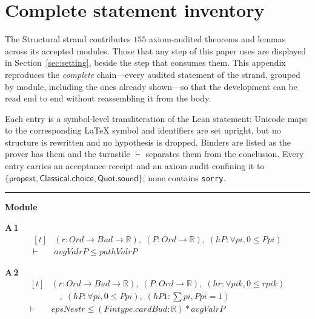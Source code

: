 \appendices
\section{Complete statement inventory}
\label{app:inventory}

The Structural strand contributes $155$ axiom-audited theorems and lemmas across its accepted modules. Those that any step of this paper uses are displayed in Section~\ref{sec:setting}, beside the step that consumes them. This appendix reproduces the \emph{complete} chain---every audited statement of the strand, grouped by module, including the ones already shown---so that the development can be read end to end without reassembling it from the body.

Each entry is a symbol-level transliteration of the Lean statement: Unicode maps to the corresponding \LaTeX{} symbol and identifiers are set upright, but no structure is rewritten and no hypothesis is dropped. Binders are listed as the prover has them and the turnstile $\vdash$ separates them from the conclusion. Every entry carries an acceptance receipt and an axiom audit confining it to $\{\textsf{propext},\textsf{Classical.choice},\textsf{Quot.sound}\}$; none contains \texttt{sorry}.

\vspace{4pt}\noindent\rule{\columnwidth}{0.4pt}\par\vspace{2pt}
\noindent\textbf{Module }\par\vspace{3pt}

\noindent\textbf{A\,1}\quad{}
{\footnotesize\[ \begin{aligned}[t]
&(\mathit{r} : \mathit{Ord} \to \mathit{Bud} \to \mathbb{R} ),\; (\mathit{P} : \mathit{Ord} \to \mathbb{R} ),\; (\mathit{hP} : \forall \mathit{pi}, 0 \leq \mathit{P} \mathit{pi})\\
\vdash\;&\mathit{avgVal} \mathit{r} \mathit{P} \leq \mathit{pathVal} \mathit{r} \mathit{P}
\end{aligned} \]}

\noindent\textbf{A\,2}\quad{}
{\footnotesize\[ \begin{aligned}[t]
&(\mathit{r} : \mathit{Ord} \to \mathit{Bud} \to \mathbb{R} ),\; (\mathit{P} : \mathit{Ord} \to \mathbb{R} ),\; (\mathit{hr} : \forall \mathit{pi} \mathit{k}, 0 \leq \mathit{r} \mathit{pi} \mathit{k})\\
&\quad ,\; (\mathit{hP} : \forall \mathit{pi}, 0 \leq \mathit{P} \mathit{pi}),\; (\mathit{hP1} : \textstyle\sum \mathit{pi}, \mathit{P} \mathit{pi} = 1)\\
\vdash\;&\mathit{epsNest} \mathit{r} \leq (\mathit{Fintype}.\mathit{card} \mathit{Bud} : \mathbb{R} ) * \mathit{avgVal} \mathit{r} \mathit{P}
\end{aligned} \]}

